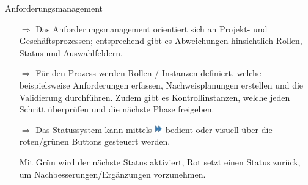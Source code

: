 \documentclass{article}
\begin{document}
\begin{beamerlikethm}{Anforderungsmanagement}
\begin{itemize}
  \item[$\Longrightarrow$] Das Anforderungsmanagement orientiert sich an Projekt- und Geschäftsprozessen; entsprechend gibt es Abweichungen hinsichtlich Rollen, Status und Auswahlfeldern.
  \item[$\Longrightarrow$] Für den Prozess werden Rollen / Instanzen definiert, welche beispielsweise Anforderungen erfassen, Nachweisplanungen erstellen und die Validierung durchführen. Zudem gibt es Kontrollinstanzen, welche jeden Schritt überprüfen und die nächste Phase freigeben.
  \item[$\Longrightarrow$] Das Statussystem kann mittels \includegraphics[height=10pt]{Icons/Status_aendern.png} bedient oder visuell über die roten/grünen Buttons gesteuert werden.

\begin{center}
\end{center}
\small{Mit Grün wird der nächste Status aktiviert, Rot setzt einen Status zurück, um Nachbesserungen/Ergänzungen vorzunehmen.}

\end{itemize}
\end{beamerlikethm}

\end{document}

